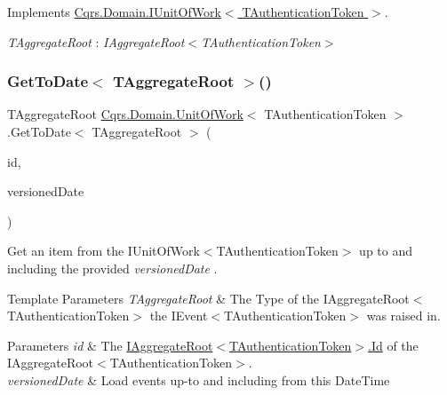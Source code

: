 Implements \hyperlink{interfaceCqrs_1_1Domain_1_1IUnitOfWork_aee78f81d472577a65356bc1c05207180_aee78f81d472577a65356bc1c05207180}{Cqrs.\+Domain.\+I\+Unit\+Of\+Work$<$ T\+Authentication\+Token $>$}.

\begin{Desc}
\item[Type Constraints]\begin{description}
\item[{\em T\+Aggregate\+Root} : {\em I\+Aggregate\+Root$<$T\+Authentication\+Token$>$}]\end{description}
\end{Desc}
\mbox{\label{classCqrs_1_1Domain_1_1UnitOfWork_aac25e1b9946b0d0337bda627671d0dae_aac25e1b9946b0d0337bda627671d0dae}} 
\subsubsection{\texorpdfstring{Get\+To\+Date$<$ T\+Aggregate\+Root $>$()}{GetToDate< TAggregateRoot >()}}
{\footnotesize\ttfamily T\+Aggregate\+Root \hyperlink{classCqrs_1_1Domain_1_1UnitOfWork}{Cqrs.\+Domain.\+Unit\+Of\+Work}$<$ T\+Authentication\+Token $>$.Get\+To\+Date$<$ T\+Aggregate\+Root $>$ (\begin{DoxyParamCaption}\item[{Guid}]{id,  }\item[{Date\+Time}]{versioned\+Date }\end{DoxyParamCaption})}



Get an item from the I\+Unit\+Of\+Work$<$\+T\+Authentication\+Token$>$ up to and including the provided {\itshape versioned\+Date} . 


\begin{DoxyTemplParams}{Template Parameters}
{\em T\+Aggregate\+Root} & The Type of the I\+Aggregate\+Root$<$\+T\+Authentication\+Token$>$ the I\+Event$<$\+T\+Authentication\+Token$>$ was raised in.\\
\hline
\end{DoxyTemplParams}

\begin{DoxyParams}{Parameters}
{\em id} & The \hyperlink{interfaceCqrs_1_1Domain_1_1IAggregateRoot_a04aa3198f1371afa345a58e8fcb713d7_a04aa3198f1371afa345a58e8fcb713d7}{I\+Aggregate\+Root$<$\+T\+Authentication\+Token$>$.\+Id} of the I\+Aggregate\+Root$<$\+T\+Authentication\+Token$>$.\\
\hline
{\em versioned\+Date} & Load events up-\/to and including from this Date\+Time\\
\hline
\end{DoxyParams}



